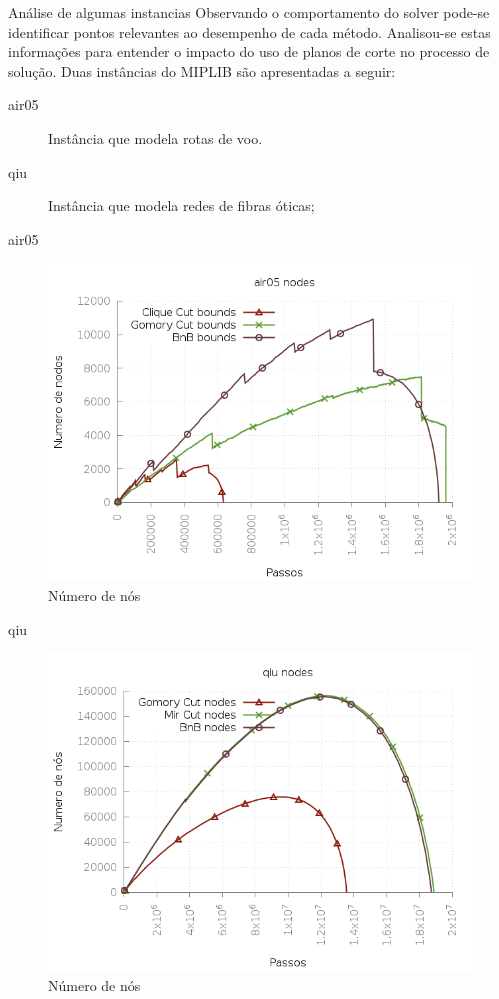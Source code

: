 \documentclass{beamer}
\begin{document}
\begin{frame}[c]{Análise de algumas instancias}
    Observando o comportamento do solver pode-se identificar pontos relevantes ao desempenho de cada método.
    Analisou-se estas informações para entender o impacto do uso de planos de corte no processo de solução.
    Duas instâncias do MIPLIB são apresentadas a seguir:

    \begin{description}
        \item[air05] Instância que modela rotas de voo.
        \item[qiu] Instância que modela redes de fibras óticas;
    \end{description}
\end{frame}

\begin{frame}[c]{air05}
    \begin{figure}[htpb]
        \centering
        \includegraphics[width=0.8\linewidth]{air05_nodes}
        \caption{Número de nós}
    \end{figure}
\end{frame}

\begin{frame}[c]{qiu}
    \begin{figure}[htpb]
        \centering
        \includegraphics[width=0.8\linewidth]{qiu_nodes}
        \caption{Número de nós}
    \end{figure}
\end{frame}
\end{document}

